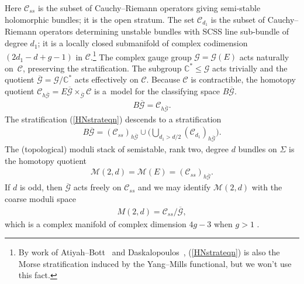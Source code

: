 \documentclass[10pt,a4paper]{amsart}
\numberwithin{equation}{section}
\begin{document}
Here ${\mathcal C}_{ss}$ is the subset of Cauchy--Riemann operators giving semi-stable holomorphic bundles; it is the open stratum. The set ${\mathcal C}_{d_1}$ is the subset of Cauchy--Riemann operators determining unstable bundles with SCSS line sub-bundle of degree $d_1$; it is a locally closed submanifold of complex codimension $(2d_1-d+g-1)$ in ${\mathcal C}$.\footnote{By work of Atiyah--Bott~\cite{AB} and Daskalopoulos~\cite{D}, (\ref{HNstrateqn}) is also the Morse stratif\/ication induced by the Yang--Mills functional, but we won't use this fact.} The complex gauge group ${\mathcal G} = {\mathcal G}(E)$ acts naturally on~${\mathcal C}$, preserving the stratif\/ication. The subgroup ${\mathbb C}^* \leq {\mathcal G}$ acts trivially and the quotient $\overline{{\mathcal G}} = {\mathcal G}/{\mathbb C}^*$ acts ef\/fectively on ${\mathcal C}$. Because ${\mathcal C}$ is contractible, the homotopy quotient $ {\mathcal C}_{h\overline{{\mathcal G}}}= E\overline{{\mathcal G}} \times_{\overline{{\mathcal G}}} {\mathcal C}$ is a~model for the classifying space $B \overline{{\mathcal G}}$.
\begin{gather*} B\overline{{\mathcal G}} = {\mathcal C}_{h\overline{{\mathcal G}}}.\end{gather*}
The stratif\/ication (\ref{HNstrateqn}) descends to a stratif\/ication
\begin{gather}\label{HNstratquot}
 B\overline{{\mathcal G}} = ({\mathcal C}_{ss})_{{h\overline{{\mathcal G}}} } \cup \bigg( \bigcup_{d_1 > d/2} ({\mathcal C}_{d_1})_{{h\overline{{\mathcal G}}} } \bigg).
\end{gather}
The (topological) moduli stack of semistable, rank two, degree $d$ bundles on $\Sigma$ is the homotopy quotient
\begin{gather*} {\mathcal M}(2,d) = {\mathcal M}(E) = ({\mathcal C}_{ss})_{{h\overline{{\mathcal G}}} } .\end{gather*}
If $d$ is odd, then $\overline{{\mathcal G}}$ acts freely on ${\mathcal C}_{ss}$ and we may identify $ {\mathcal M}(2,d)$ with the coarse moduli space \begin{gather*}M(2,d) = {\mathcal C}_{ss}/\overline{{\mathcal G}},\end{gather*} which is a complex manifold of complex dimension $4g-3$ when $g>1$ .
\end{document}
